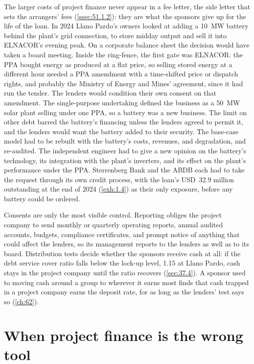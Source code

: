 The larger costs of project finance never appear in a fee letter, the side letter that sets the arrangers' fees (\cref{ssec:51.1.2}): they are what the sponsors give up for the life of the loan. In 2024 Llano Pardo's owners looked at adding a 10~MW battery behind the plant's grid connection, to store midday output and sell it into ELNACOR's evening peak. On a corporate balance sheet the decision would have taken a board meeting. Inside the ring-fence, the first gate was ELNACOR: the PPA bought energy as produced at a flat price, so selling stored energy at a different hour needed a PPA amendment with a time-shifted price or dispatch rights, and probably the Ministry of Energy and Mines' agreement, since it had run the tender. The lenders would condition their own consent on that amendment. The single-purpose undertaking defined the business as a 50~MW solar plant selling under one PPA, so a battery was a new business. The limit on other debt barred the battery's financing unless the lenders agreed to permit it, and the lenders would want the battery added to their security. The base-case model had to be rebuilt with the battery's costs, revenues, and degradation, and re-audited. The independent engineer had to give a new opinion on the battery's technology, its integration with the plant's inverters, and its effect on the plant's performance under the PPA. Sterrenberg Bank and the ABDB each had to take the request through its own credit process, with the loan's USD~32.9 million outstanding at the end of 2024 (\cref{exh:1.4}) as their only exposure, before any battery could be ordered.

Consents are only the most visible control. Reporting obliges the project company to send monthly or quarterly operating reports, annual audited accounts, budgets, compliance certificates, and prompt notice of anything that could affect the lenders, so its management reports to the lenders as well as to its board. Distribution tests decide whether the sponsors receive cash at all: if the debt service cover ratio falls below the lock-up level, 1.15\x{} at Llano Pardo, cash stays in the project company until the ratio recovers (\cref{sec:37.4}). A sponsor used to moving cash around a group to wherever it earns most finds that cash trapped in a project company earns the deposit rate, for as long as the lenders' test says so (\cref{ch:62}).

\section{When project finance is the wrong tool}\label{sec:2.7}

